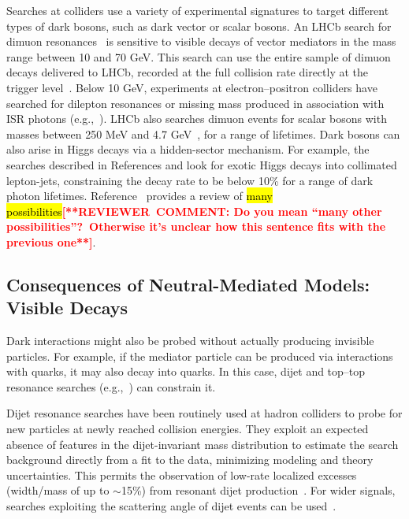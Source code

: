 \documentclass{ar-1col}
\newcommand{\IP}{invisible particle}
\begin{document}
Searches at colliders use a variety of experimental signatures to
target different types of dark bosons, such as dark vector or
scalar bosons. An LHCb search for dimuon
resonances~\cite{Aaij:2017rft} is sensitive to visible decays of
vector mediators in the mass range between 10 and 70 GeV. This
search can use the entire sample of dimuon decays delivered to
LHCb, recorded at the full collision rate directly at the trigger
level~\cite{Aaij:2016rxn}. Below 10 GeV, experiments at
electron--positron colliders have searched for dilepton resonances
or missing mass produced in association with ISR photons (e.g.,~). LHCb also searches dimuon
events for scalar bosons with masses between 250 MeV and 4.7
GeV~\cite{Aaij:2016qsm}, for a range of lifetimes. Dark bosons can
also arise in Higgs decays via a hidden-sector mechanism. For
example, the searches described in References  and 
look for exotic Higgs decays into collimated lepton-jets,
constraining the decay rate to be below 10\% for a range of dark
photon lifetimes. Reference~ provides a review of
\hl{many possibilities}\textbf{\textcolor{red}{[**REVIEWER\ COMMENT: Do you mean ``many other possibilities''?\ Otherwise it's unclear how this sentence fits with the previous one**]}}.

\subsection{Consequences of Neutral-Mediated Models: Visible Decays}\label{sec:MediatorSearches} \label{sub:twoBody}

Dark interactions might also be probed without actually producing
{\IP}s. For example, if the mediator particle can be produced via
interactions with quarks, it may also decay into quarks. In this
case, dijet and top--top resonance searches (e.g.,~) can constrain it.

Dijet resonance searches have been routinely used at hadron
colliders to probe for new particles at newly reached collision
energies. They exploit an expected absence of features in the
dijet-invariant mass distribution to estimate the search
background directly from a fit to the data, minimizing modeling
and theory uncertainties. This permits the observation of low-rate
localized excesses (width/mass of up to $\sim$15\%) from resonant
dijet production~\cite{Aaboud:2017yvp,CMS-PAS-EXO-16-056}. For
wider signals, searches exploiting the scattering angle of dijet
events can be used~\cite{CMS-PAS-EXO-16-046,Aaboud:2017yvp}.
\end{document}

